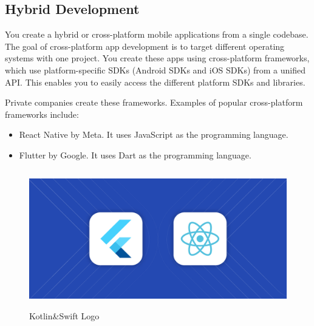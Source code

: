 \subsection*{Hybrid Development}
You create a hybrid or cross-platform mobile applications from a single codebase. The goal of cross-platform app development is to target different operating systems with one project. You create these apps using cross-platform frameworks, which use platform-specific SDKs (Android SDKs and iOS SDKs) from a unified API. This enables you to easily access the different platform SDKs and libraries.

Private companies create these frameworks. Examples of popular cross-platform frameworks include:

\begin{itemize}
\renewcommand\labelitemi{\textbf{\Huge .}}
\item React Native by Meta. It uses JavaScript as the programming language.
\item Flutter by Google. It uses Dart as the programming language.
\end{itemize}
\begin{figure}[H]
    \centering
    \includegraphics[height=6cm]{images/chap1/reactNative_Flutter.png}
    \caption{Kotlin\&Swift Logo}
    \label{fig:enter-label}
\end{figure}
